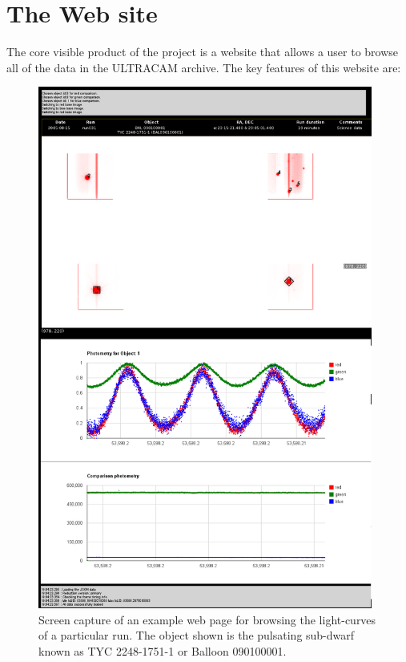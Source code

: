 \section{The Web site}
The core visible product of the project is a website that allows a user to browse all of the data in the ULTRACAM archive. The key features of this website are:
\begin{figure}
	\centering
	\includegraphics[width=110mm]{images/run031_on_the_night_of_2005-08-15.png}
	\caption{Screen capture of an example web page for browsing the light-curves of a particular run. The object shown is the pulsating sub-dwarf known as TYC 2248-1751-1 or Balloon 090100001.}
	\label{browser}
\end{figure}

